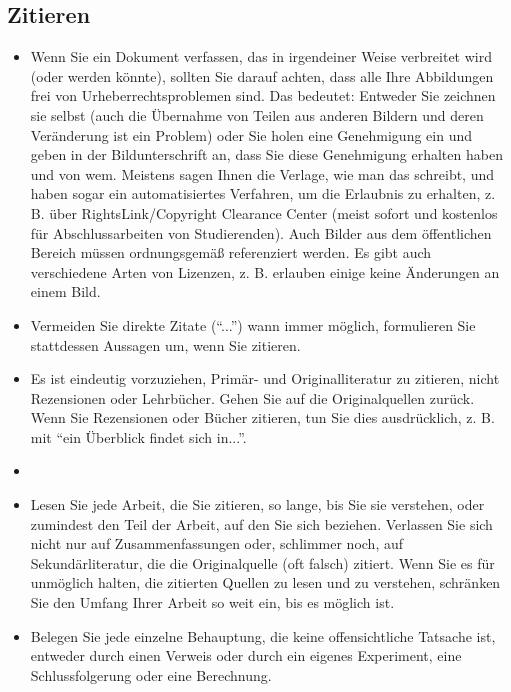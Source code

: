 
\subsection{Zitieren}
\label{sec:zitieren}

\begin{itemize}
\item Wenn Sie ein Dokument verfassen, das in irgendeiner Weise verbreitet wird (oder werden könnte), sollten Sie darauf achten, dass alle Ihre Abbildungen frei von Urheberrechtsproblemen sind. Das bedeutet: Entweder Sie zeichnen sie selbst (auch die Übernahme von Teilen aus anderen Bildern und deren Veränderung ist ein Problem) oder Sie holen eine Genehmigung ein und geben in der Bildunterschrift an, dass Sie diese Genehmigung erhalten haben und von wem. Meistens sagen Ihnen die Verlage, wie man das schreibt, und haben sogar ein automatisiertes Verfahren, um die Erlaubnis zu erhalten, z. B. über RightsLink/Copyright Clearance Center (meist sofort und kostenlos für Abschlussarbeiten von Studierenden). Auch Bilder aus dem öffentlichen Bereich müssen ordnungsgemäß referenziert werden. Es gibt auch verschiedene Arten von Lizenzen, z. B. erlauben einige keine Änderungen an einem Bild.

\item Vermeiden Sie direkte Zitate (``...'') wann immer möglich, formulieren Sie stattdessen Aussagen um, wenn Sie zitieren.

\item Es ist eindeutig vorzuziehen, Primär- und Originalliteratur zu zitieren, nicht Rezensionen oder Lehrbücher. Gehen Sie auf die Originalquellen zurück. Wenn Sie Rezensionen oder Bücher zitieren, tun Sie dies ausdrücklich, z. B. mit ``ein Überblick findet sich in...''.

\item  \item Lesen Sie jede Arbeit, die Sie zitieren, so lange, bis Sie sie verstehen, oder zumindest den Teil der Arbeit, auf den Sie sich beziehen. Verlassen Sie sich nicht nur auf Zusammenfassungen oder, schlimmer noch, auf Sekundärliteratur, die die Originalquelle (oft falsch) zitiert. Wenn Sie es für unmöglich halten, die zitierten Quellen zu lesen und zu verstehen, schränken Sie den Umfang Ihrer Arbeit so weit ein, bis es möglich ist.

\item Belegen Sie jede einzelne Behauptung, die keine offensichtliche Tatsache ist, entweder durch einen Verweis oder durch ein eigenes Experiment, eine Schlussfolgerung oder eine Berechnung. 

\cite{Menge}
\end{itemize}